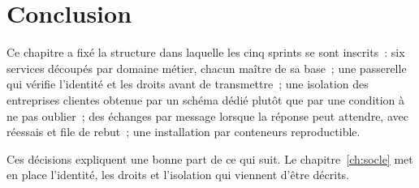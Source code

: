 \section{Conclusion}

Ce chapitre a fixé la structure dans laquelle les cinq sprints se sont inscrits~: six services
découpés par domaine métier, chacun maître de sa base~; une passerelle qui vérifie l'identité et les
droits avant de transmettre~; une isolation des entreprises clientes obtenue par un schéma dédié
plutôt que par une condition à ne pas oublier~; des échanges par message lorsque la réponse peut
attendre, avec réessais et file de rebut~; une installation par conteneurs reproductible.

Ces décisions expliquent une bonne part de ce qui suit. Le chapitre~\ref{ch:socle} met en place
l'identité, les droits et l'isolation qui viennent d'être décrits.

